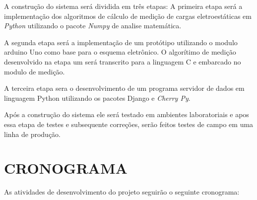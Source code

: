 \documentclass[
	12pt,				%
	openright,			%
	oneside,			%
	a4paper,			%
	chapter=TITLE,		%
	english,			%
	french,				%
	spanish,			%
	brazil,				%
	article,			%
	]{uea-abntex2}
\begin{document}
A construção do sistema será dividida em três etapas: A primeira etapa será a implementação dos algoritmos de cálculo de medição de cargas eletroestáticas em \textit{Python} utilizando o pacote \textit{Numpy} de analise matemática.\cite{numpy}

A segunda etapa será a implementação de um protótipo utilizando o modulo arduino Uno como base para o esquema eletrônico. O algorítimo de medição desenvolvido na etapa um será transcrito para a linguagem C e embarcado no modulo de medição.  \cite{arduino}

A terceira etapa sera o desenvolvimento de um programa servidor de dados em linguagem Python utilizando os pacotes Django\cite{django} e \textit{Cherry Py}\cite{cherrypy}.

Após a construção do sistema ele será testado em ambientes laboratoriais e apos essa etapa de testes e subsequente correções, serão feitos testes de campo em uma linha de produção.


\newpage

\section{CRONOGRAMA}

As atividades de desenvolvimento do projeto seguirão o seguinte cronograma:
\newpage

\begin{landscape}



\end{landscape}

\newpage
\vspace*{2.3cm}
\renewcommand{\bibname}{REFERÊNCIAS}



%
%





\end{document}
